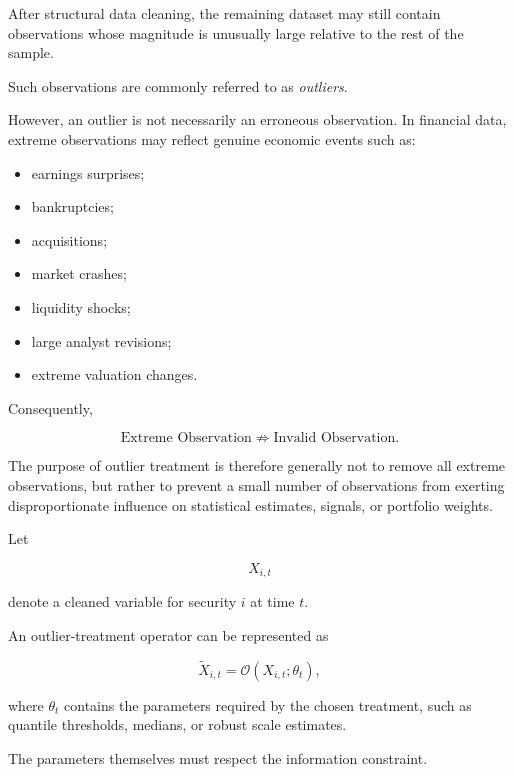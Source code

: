 \documentclass[11pt,a4paper]{article}
\begin{document}
After structural data cleaning, the remaining dataset may still contain
observations whose magnitude is unusually large relative to the rest of the
sample.

Such observations are commonly referred to as \emph{outliers}.

However, an outlier is not necessarily an erroneous observation. In financial
data, extreme observations may reflect genuine economic events such as:

\begin{itemize}
    \item earnings surprises;
    \item bankruptcies;
    \item acquisitions;
    \item market crashes;
    \item liquidity shocks;
    \item large analyst revisions;
    \item extreme valuation changes.
\end{itemize}

Consequently,

\begin{equation}
\boxed{
\text{Extreme Observation}
\not\Rightarrow
\text{Invalid Observation}.
}
\end{equation}

The purpose of outlier treatment is therefore generally not to remove all
extreme observations, but rather to prevent a small number of observations
from exerting disproportionate influence on statistical estimates, signals, or
portfolio weights.

Let

\begin{equation}
X_{i,t}
\end{equation}

denote a cleaned variable for security $i$ at time $t$.

An outlier-treatment operator can be represented as

\begin{equation}
\boxed{
\widetilde{X}_{i,t}
=
\mathcal{O}
\left(
X_{i,t};
\theta_t
\right),
}
\end{equation}

where $\theta_t$ contains the parameters required by the chosen treatment,
such as quantile thresholds, medians, or robust scale estimates.

The parameters themselves must respect the information constraint.
\end{document}
